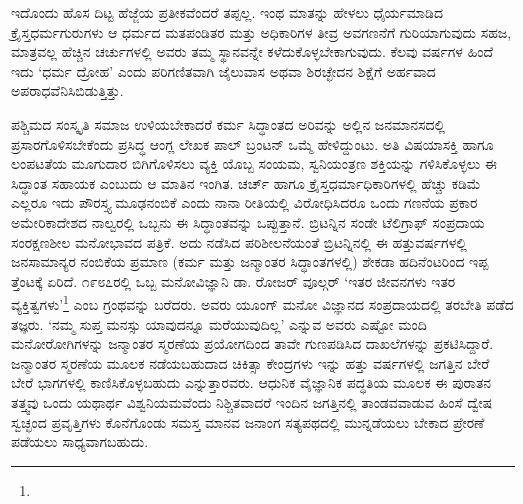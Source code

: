 ಇದೊಂದು ಹೊಸ ದಿಟ್ಟ ಹೆಜ್ಜೆಯ ಪ್ರತೀಕವೆಂದರೆ ತಪ್ಪಲ್ಲ. ಇಂಥ ಮಾತನ್ನು ಹೇಳಲು ಧೈರ್ಯಮಾಡಿದ ಕ್ರೈಸ್ತಧರ್ಮಗುರುಗಳು ಆ ಧರ್ಮದ ಮತಪಂಡಿತರ ಮತ್ತು ಅಧಿಕಾರಿಗಳ ತೀವ್ರ ಅವಗಣನೆಗೆ ಗುರಿಯಾಗುವುದು ಸಹಜ, ಮಾತ್ರವಲ್ಲ ಹೆಚ್ಚಿನ ಚರ್ಚುಗಳಲ್ಲಿ ಅವರು ತಮ್ಮ ಸ್ಥಾನವನ್ನೇ ಕಳೆದುಕೊಳ್ಳಬೇಕಾಗುವುದು. ಕೆಲವು ವರ್ಷಗಳ ಹಿಂದೆ ಇದು ‘ಧರ್ಮ ದ್ರೋಹ’ ಎಂದು ಪರಿಗಣಿತವಾಗಿ ಜೈಲುವಾಸ ಅಥವಾ ಶಿರಚ್ಛೇದನ ಶಿಕ್ಷೆಗೆ ಅರ್ಹವಾದ ಅಪರಾಧವೆನಿಸಿಬಿಡುತ್ತಿತ್ತು.

ಪಶ್ಚಿಮದ ಸಂಸ್ಕೃತಿ ಸಮಾಜ ಉಳಿಯಬೇಕಾದರೆ ಕರ್ಮ ಸಿದ್ಧಾಂತದ ಅರಿವನ್ನು ಅಲ್ಲಿನ ಜನಮಾನಸದಲ್ಲಿ ಪ್ರಸಾರಗೊಳಿಸಬೇಕೆಂದು ಪ್ರಸಿದ್ಧ ಆಂಗ್ಲ ಲೇಖಕ ಪಾಲ್ ಬ್ರಂಟನ್ ಒಮ್ಮೆ ಹೇಳಿದ್ದುಂಟು. ಅತಿ ವಿಷಯಾಸಕ್ತಿ ಹಾಗೂ ಲಂಪಟತೆಯ ಮೂಗುದಾರ ಬಿಗಿಗೊಳಿಸಲು ವ್ಯಕ್ತಿ ಯೊಬ್ಬ ಸಂಯಮ, ಸ್ವನಿಯಂತ್ರಣ ಶಕ್ತಿಯನ್ನು ಗಳಿಸಿಕೊಳ್ಳಲು ಈ ಸಿದ್ಧಾಂತ ಸಹಾಯಕ ಎಂಬುದು ಆ ಮಾತಿನ ಇಂಗಿತ. ಚರ್ಚ್ ಹಾಗೂ ಕ್ರೈಸ್ತಧರ್ಮಾಧಿಕಾರಿಗಳಲ್ಲಿ ಹೆಚ್ಚು ಕಡಿಮೆ ಎಲ್ಲರೂ ಇದು ಪೌರಸ್ತ್ಯ ಮೂಢನಂಬಿಕೆ ಎಂದು ನಾನಾ ರೀತಿಯಲ್ಲಿ ವಿರೋಧಿಸಿದರೂ ಒಂದು ಗಣನೆಯ ಪ್ರಕಾರ ಅಮೇರಿಕಾದೇಶದ ನಾಲ್ವರಲ್ಲಿ ಒಬ್ಬನು ಈ ಸಿದ್ಧಾಂತವನ್ನು ಒಪ್ಪುತ್ತಾನೆ. ಬ್ರಿಟನ್ನಿನ ಸಂಡೇ ಟೆಲಿಗ್ರಾಫ್ ಸಂಪ್ರದಾಯ ಸಂರಕ್ಷಣಶೀಲ ಮನೋಭಾವದ ಪತ್ರಿಕೆ. ಅದು ನಡೆಸಿದ ಪರಿಶೀಲನೆಯಂತೆ ಬ್ರಿಟನ್ನಿನಲ್ಲಿ ಈ ಹತ್ತುವರ್ಷಗಳಲ್ಲಿ ಜನಸಾಮಾನ್ಯರ ನಂಬಿಕೆಯ ಪ್ರಮಾಣ (ಕರ್ಮ ಮತ್ತು ಜನ್ಮಾಂತರ ಸಿದ್ಧಾಂತಗಳಲ್ಲಿ) ಶೇಕಡಾ ಹದಿನೆಂಟರಿಂದ ಇಪ್ಪ ತ್ತೆಂಟಕ್ಕೆ ಏರಿದೆ. ೧೯೮೭ರಲ್ಲಿ ಒಬ್ಬ ಮನೋವಿಜ್ಞಾನಿ ಡಾ. ರೋಜರ್ ವೂಲ್ಗರ್ ‘ಇತರ ಜೀವನಗಳು ಇತರ ವ್ಯಕ್ತಿತ್ವಗಳು’\footnote{\hfill{}} ಎಂಬ ಗ್ರಂಥವನ್ನು ಬರೆದರು. ಅವರು ಯೂಂಗ್ ಮನೋ ವಿಜ್ಞಾನದ ಸಂಪ್ರದಾಯದಲ್ಲಿ ತರಬೇತಿ ಪಡೆದ ತಜ್ಞರು. ‘ನಮ್ಮ ಸುಪ್ತ ಮನಸ್ಸು ಯಾವುದನ್ನೂ ಮರೆಯುವುದಿಲ್ಲ’ ಎನ್ನುವ ಅವರು ಎಷ್ಟೋ ಮಂದಿ ಮನೋರೋಗಿಗಳನ್ನು ಜನ್ಮಾಂತರ ಸ್ಮರಣೆಯ ಪ್ರಯೋಗದಿಂದ ತಾವೇ ಗುಣಪಡಿಸಿದ ದಾಖಲೆಗಳನ್ನು ಪ್ರಕಟಿಸಿದ್ದಾರೆ. ಜನ್ಮಾಂತರ ಸ್ಮರಣೆಯ ಮೂಲಕ ನಡೆಯಬಹುದಾದ ಚಿಕಿತ್ಸಾ ಕೇಂದ್ರಗಳು ಇನ್ನು ಹತ್ತು ವರ್ಷಗಳಲ್ಲಿ ಜಗತ್ತಿನ ಬೇರೆ ಬೇರೆ ಭಾಗಗಳಲ್ಲಿ ಕಾಣಿಸಿಕೊಳ್ಳಬಹುದು ಎನ್ನುತ್ತಾರವರು. ಆಧುನಿಕ ವೈಜ್ಞಾನಿಕ ಪದ್ಧತಿಯ ಮೂಲಕ ಈ ಪುರಾತನ ತತ್ತ್ವವು ಒಂದು ಯಥಾರ್ಥ ವಿಶ್ವನಿಯಮವೆಂದು ನಿಶ್ಚಿತವಾದರೆ ಇಂದಿನ ಜಗತ್ತಿನಲ್ಲಿ ತಾಂಡವವಾಡುವ ಹಿಂಸೆ ದ್ವೇಷ ಸ್ವಚ್ಛಂದ ಪ್ರವೃತ್ತಿಗಳು ಕೊನೆಗೊಂಡು ಸಮಸ್ತ ಮಾನವ ಜನಾಂಗ ಸತ್ಯಪಥದಲ್ಲಿ ಮುನ್ನಡೆಯಲು ಬೇಕಾದ ಪ್ರೇರಣೆ ಪಡೆಯಲು ಸಾಧ್ಯವಾಗಬಹುದು.


